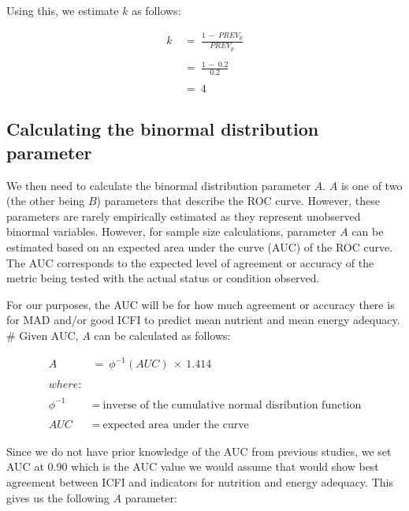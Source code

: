 \documentclass[12pt,a4paper]{article}
\theoremstyle{definition}
\theoremstyle{definition}
\theoremstyle{definition}
\theoremstyle{remark}
\begin{document}
Using this, we estimate \(k\) as follows:

\[ \begin{aligned} 
k ~ & = ~ \frac{1 ~ - ~ PREV_p}{PREV_p} \\
\\
& = ~ \frac{1 ~ - ~ 0.2}{0.2} \\
\\
& = ~ 4
\end{aligned} \]

\hypertarget{calculating-the-binormal-distribution-parameter}{%
\subsection{Calculating the binormal distribution
parameter}\label{calculating-the-binormal-distribution-parameter}}

We then need to calculate the binormal distribution parameter \(A\).
\(A\) is one of two (the other being \(B\)) parameters that describe the
ROC curve. However, these parameters are rarely empirically estimated as
they represent unobserved binormal variables. However, for sample size
calculations, parameter \(A\) can be estimated based on an expected area
under the curve (AUC) of the ROC curve. The AUC corresponds to the
expected level of agreement or accuracy of the metric being tested with
the actual status or condition observed.

For our purposes, the AUC will be for how much agreement or accuracy
there is for MAD and/or good ICFI to predict mean nutrient and mean
energy adequacy. \# Given AUC, \(A\) can be calculated as follows:

\[ \begin{aligned}
A ~ & = ~ \phi ^ {-1}(AUC) ~ \times ~ 1.414 \\
\\
where: & \\
\\
\phi ^ {-1} ~ & = ~ \text{inverse of the cumulative normal disribution function} \\
\\
AUC ~ & = ~ \text{expected area under the curve}
\end{aligned} \]

Since we do not have prior knowledge of the AUC from previous studies,
we set AUC at 0.90 which is the AUC value we would assume that would
show best agreement between ICFI and indicators for nutrition and energy
adequacy. This gives us the following \(A\) parameter:
\end{document}
